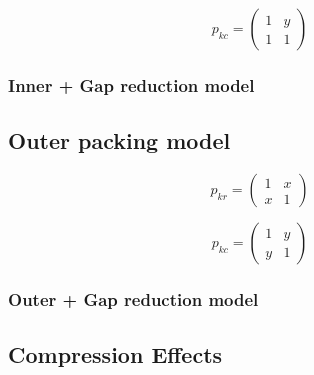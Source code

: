 \documentclass[12pt,a4paper]{IEEEtran}
\begin{document}
\begin{equation}
p_{kc} = \left (
\begin{array}{cc}
1 & y\\
1 & 1
\end{array} \right )
\end{equation}

\subsubsection{Inner + Gap reduction model}

\subsection{Outer packing model}

\begin{equation}
p_{kr} = \left (
\begin{array}{cc}
1 & x\\
x & 1
\end{array} \right )
\end{equation}

\begin{equation}
p_{kc} = \left (
\begin{array}{cc}
1 & y\\
y & 1
\end{array} \right )
\end{equation}

\subsubsection{Outer + Gap reduction model}


\subsection{Compression Effects\label{sec:CompressionEffect}}

\end{document}
